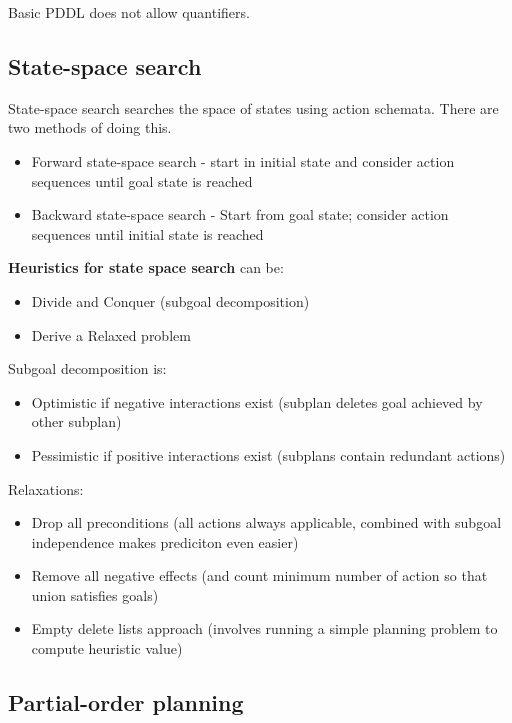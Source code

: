 \documentclass{article}
\begin{document}
Basic PDDL does not allow quantifiers. 

\subsection{State-space search}

State-space search searches the space of states using action schemata. There are two methods of doing this.

\begin{itemize}
    \item Forward state-space search - start in initial state and consider action sequences until goal state is reached
    \item Backward state-space search - Start from goal state; consider action sequences until initial state is reached
\end{itemize}

\textbf{Heuristics for state space search} can be:
\begin{itemize}
    \item Divide and Conquer (subgoal decomposition)
    \item Derive a Relaxed problem
\end{itemize}

Subgoal decomposition is:
\begin{itemize}
    \item Optimistic if negative interactions exist (subplan deletes goal achieved by other subplan)
    \item Pessimistic if positive interactions exist (subplans contain redundant actions)
\end{itemize}

Relaxations:
\begin{itemize}
    \item Drop all preconditions (all actions always applicable, combined with subgoal independence makes prediciton even easier)
    \item Remove all negative effects (and count minimum number of action so that union satisfies goals)
    \item Empty delete lists approach (involves running a simple planning problem to compute heuristic value)
\end{itemize}

\subsection{Partial-order planning}
\end{document}
